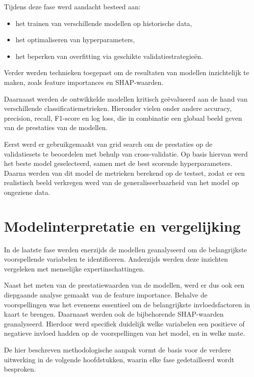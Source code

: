 Tijdens deze fase werd aandacht besteed aan:
\begin{itemize}
\item het trainen van verschillende modellen op historische data,
\item het optimaliseren van hyperparameters,
\item het beperken van overfitting via geschikte validatiestrategieën.
\end{itemize}

Verder werden technieken toegepast om de resultaten van modellen inzichtelijk te maken, zoals feature importances en SHAP-waarden.

\vspace{5pt}

Daarnaast werden de ontwikkelde modellen kritisch geëvalueerd aan de hand van verschillende classificatiemetrieken.
Hieronder vielen onder andere accuracy, precision, recall, F1-score en log loss, die in combinatie een globaal beeld geven van de prestaties van de modellen.

\vspace{5pt}

Eerst werd er gebruikgemaakt van grid search om de prestaties op de validatiesets te beoordelen met behulp van cross-validatie.
Op basis hiervan werd het beste model geselecteerd, samen met de best scorende hyperparameters.
Daarna werden van dit model de metrieken berekend op de testset, zodat er een realistisch beeld verkregen werd van de generaliseerbaarheid van het model op ongeziene data.

\section{Modelinterpretatie en vergelijking}

In de laatste fase werden enerzijds de modellen geanalyseerd om de belangrijkste voorspellende variabelen te identificeren.
Anderzijds werden deze inzichten vergeleken met menselijke expertinschattingen.

Naast het meten van de prestatiewaarden van de modellen, werd er dus ook een diepgaande analyse gemaakt van de feature importance.
Behalve de voorspellingen was het eveneens essentieel om de belangrijkste invloedsfactoren in kaart te brengen.
Daarnaast werden ook de bijbehorende SHAP-waarden geanalyseerd.
Hierdoor werd specifiek duidelijk welke variabelen een positieve of negatieve invloed hadden op de voorspellingen van het model, en in welke mate.

\vspace{5pt}

De hier beschreven methodologische aanpak vormt de basis voor de verdere uitwerking in de volgende hoofdstukken,
waarin elke fase gedetailleerd wordt besproken.
